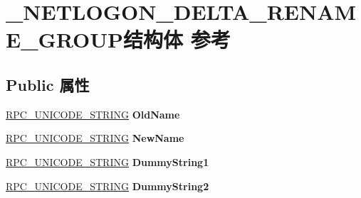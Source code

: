 \hypertarget{struct___n_e_t_l_o_g_o_n___d_e_l_t_a___r_e_n_a_m_e___g_r_o_u_p}{}\section{\+\_\+\+N\+E\+T\+L\+O\+G\+O\+N\+\_\+\+D\+E\+L\+T\+A\+\_\+\+R\+E\+N\+A\+M\+E\+\_\+\+G\+R\+O\+U\+P结构体 参考}
\label{struct___n_e_t_l_o_g_o_n___d_e_l_t_a___r_e_n_a_m_e___g_r_o_u_p}
\subsection*{Public 属性}
\begin{DoxyCompactItemize}
\item 
\mbox{\label{struct___n_e_t_l_o_g_o_n___d_e_l_t_a___r_e_n_a_m_e___g_r_o_u_p_a799403785f9e968a0ddf7aece0ad01ac}} 
\hyperlink{struct___r_p_c___u_n_i_c_o_d_e___s_t_r_i_n_g}{R\+P\+C\+\_\+\+U\+N\+I\+C\+O\+D\+E\+\_\+\+S\+T\+R\+I\+NG} {\bfseries Old\+Name}
\item 
\mbox{\label{struct___n_e_t_l_o_g_o_n___d_e_l_t_a___r_e_n_a_m_e___g_r_o_u_p_a14ac4fa3ead8e788fb0289391dbf213c}} 
\hyperlink{struct___r_p_c___u_n_i_c_o_d_e___s_t_r_i_n_g}{R\+P\+C\+\_\+\+U\+N\+I\+C\+O\+D\+E\+\_\+\+S\+T\+R\+I\+NG} {\bfseries New\+Name}
\item 
\mbox{\label{struct___n_e_t_l_o_g_o_n___d_e_l_t_a___r_e_n_a_m_e___g_r_o_u_p_ae289d6d5532043f36910c6bee5f0790e}} 
\hyperlink{struct___r_p_c___u_n_i_c_o_d_e___s_t_r_i_n_g}{R\+P\+C\+\_\+\+U\+N\+I\+C\+O\+D\+E\+\_\+\+S\+T\+R\+I\+NG} {\bfseries Dummy\+String1}
\item 
\mbox{\label{struct___n_e_t_l_o_g_o_n___d_e_l_t_a___r_e_n_a_m_e___g_r_o_u_p_a139ffc5fc22fdb48262ec33c589d24d6}} 
\hyperlink{struct___r_p_c___u_n_i_c_o_d_e___s_t_r_i_n_g}{R\+P\+C\+\_\+\+U\+N\+I\+C\+O\+D\+E\+\_\+\+S\+T\+R\+I\+NG} {\bfseries Dummy\+String2}
\item 
\mbox{\label{struct___n_e_t_l_o_g_o_n___d_e_l_t_a___r_e_n_a_m_e___g_r_o_u_p_ae4a59515ab9f7a5cd0195be622b4e4bd}} 

\end{DoxyCompactItemize}

